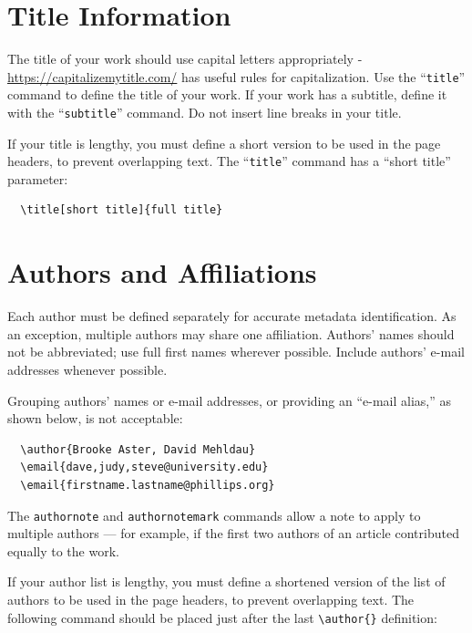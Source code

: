 \documentclass[manuscript,screen]{acmart}
\begin{document}
\hypertarget{title-information}{%
\section{Title Information}\label{title-information}}

The title of your work should use capital letters appropriately -
\url{https://capitalizemytitle.com/} has useful rules for
capitalization. Use the ``\texttt{title}'' command to define the title
of your work. If your work has a subtitle, define it with the
``\texttt{subtitle}'' command. Do not insert line breaks in your title.

If your title is lengthy, you must define a short version to be used in
the page headers, to prevent overlapping text. The ``\texttt{title}''
command has a ``short title'' parameter:

\begin{verbatim}
  \title[short title]{full title}
\end{verbatim}

\hypertarget{authors-and-affiliations}{%
\section{Authors and Affiliations}\label{authors-and-affiliations}}

Each author must be defined separately for accurate metadata
identification. As an exception, multiple authors may share one
affiliation. Authors' names should not be abbreviated; use full first
names wherever possible. Include authors' e-mail addresses whenever
possible.

Grouping authors' names or e-mail addresses, or providing an ``e-mail
alias,'' as shown below, is not acceptable:

\begin{verbatim}
  \author{Brooke Aster, David Mehldau}
  \email{dave,judy,steve@university.edu}
  \email{firstname.lastname@phillips.org}
\end{verbatim}

The \texttt{authornote} and \texttt{authornotemark} commands allow a
note to apply to multiple authors --- for example, if the first two
authors of an article contributed equally to the work.

If your author list is lengthy, you must define a shortened version of
the list of authors to be used in the page headers, to prevent
overlapping text. The following command should be placed just after the
last \texttt{\textbackslash{}author\{\}} definition:
\end{document}
